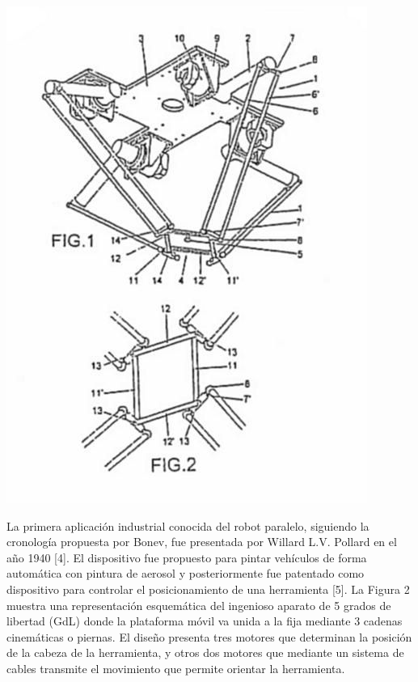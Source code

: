 \documentclass[a4paper,10pt]{article}
\begin{document}
\begin{center}
\includegraphics[width=\textwidth]{Imagen1.jpg}
\end{center}

La primera aplicación industrial conocida del robot paralelo, siguiendo la cronología propuesta por
Bonev, fue presentada por Willard L.V. Pollard en el año 1940 [4]. El dispositivo fue propuesto para
pintar vehículos de forma automática con pintura de aerosol y posteriormente fue patentado como
dispositivo para controlar el posicionamiento de una herramienta [5]. La Figura 2 muestra una
representación esquemática del ingenioso aparato de 5 grados de libertad (GdL) donde la plataforma
móvil va unida a la fija mediante 3 cadenas cinemáticas o piernas. El diseño presenta tres motores que
determinan la posición de la cabeza de la herramienta, y otros dos motores que mediante un sistema de
cables transmite el movimiento que permite orientar la herramienta.
\end{document}
